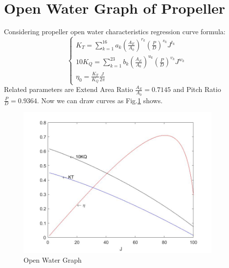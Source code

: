 \documentclass[a4paper,UTF8]{article}
\begin{document}
\section{Open Water Graph of Propeller}
Considering propeller open water characteristics regression curve formula:
\begin{equation}
\left\{
\begin{array}{lr}
K_T=\sum_{k=1}^{16}a_k\left(\frac{A_E}{A_0}\right)^{r_k}\left(\frac{P}{D}\right)^{s_k}J^{t_k} \\
10K_Q=\sum_{k=1}^{23}b_k\left(\frac{A_E}{A_0}\right)^{u_k}\left(\frac{P}{D}\right)^{v_k}J^{w_k} \\
\eta_0=\frac{K_T}{K_Q}\frac{J}{2\pi}
\end{array}
\right.
\end{equation}
Related parameters are Extend Area Ratio $\frac{A_E}{A_0}=0.7145$ and Pitch Ratio $\frac{P}{D}=0.9364$. Now we can draw curves as Fig.\ref{fig:changshui} shows.\\
\begin{figure}
	\centering
	\includegraphics[width=4in]{figure/changshui.jpg}
	\caption{Open Water Graph}
	\label{fig:changshui}
\end{figure}
\end{document}
